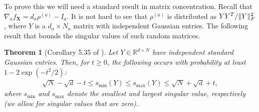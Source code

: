 \documentclass{article}
\newtheorem{theorem}{Theorem}
\DeclarePairedDelimiter{\norm}{\lVert}{\rVert}
\newcommand{\R}{{\mathbb{R}}}
\renewcommand{\vec}{\bm}
\begin{document}
To prove this we will need a standard result in matrix concentration.
Recall that $\nabla_a f_{\vec X} = d_a \rho^{(a)} - I_a$.
It is not hard to see that $\rho^{(a)}$ is distributed as $Y Y^T / \norm{Y}_F^2$, where $Y$ is a $d_a \times N_a$ matrix with independent Gaussian entries.
The following result that bounds the singular values of such random matrices.

\begin{theorem}[Corollary 5.35 of \cite{vershynin2010introduction}]\label{cor:vershynin}
Let $Y \in \R^{d \times N}$ have independent standard Gaussian entries.
Then, for $t \geq 0$, the following occurs with probability at least $1 - 2 \exp(-t^{2}/2)$:
\begin{align*}
  \sqrt{N} - \sqrt{d} - t \leq s_{\min}(Y) \leq s_{\max}(Y) \leq \sqrt{N} + \sqrt{d} + t,
\end{align*}
where $s_{\min}$ and $s_{\max}$ denote the smallest and largest singular value, respectively (we allow for singular values that are zero).
\end{theorem}
\end{document}

